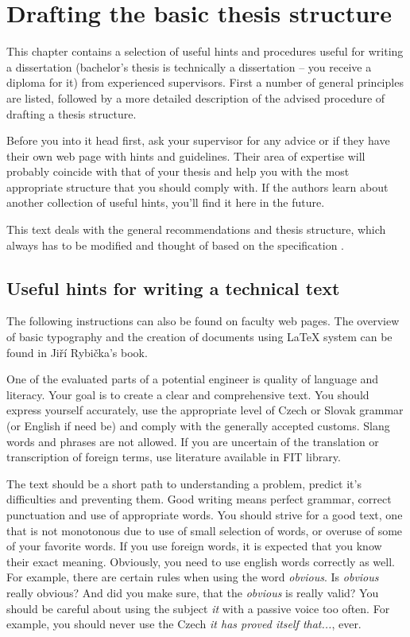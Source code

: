 \chapter{Drafting the basic thesis structure}
\label{struktura}

This chapter contains a selection of useful hints and procedures useful for writing a dissertation (bachelor's thesis is technically a dissertation -- you receive a diploma for it) from experienced supervisors. First a number of general principles are listed, followed by a more detailed description of the advised procedure of drafting a thesis structure.

Before you into it head first, ask your supervisor for any advice or if they have their own web page with hints and guidelines. Their area of expertise will probably coincide with that of your thesis and help you with the most appropriate structure that you should comply with. If the authors learn about another collection of useful hints, you'll find it here in the future.

This text deals with the general recommendations and thesis structure, which always has to be modified and thought of based on the specification \cite{Cernocky}.


\section{Useful hints for writing a technical text}

The following instructions can also be found on faculty web pages\cite{fitWeb}. The overview of basic typography and the creation of documents using \LaTeX{} system can be found in Jiří Rybička's book\cite{Rybicka}.

One of the evaluated parts of a potential engineer is quality of language and literacy. Your goal is to create a clear and comprehensive text. You should express yourself accurately, use the appropriate level of Czech or Slovak grammar (or English if need be) and comply with the generally accepted customs. Slang words and phrases are not allowed. If you are uncertain of the translation or transcription of foreign terms, use literature available in FIT library.

The text should be a short path to understanding a problem, predict it's difficulties and preventing them. Good writing means perfect grammar, correct punctuation and use of appropriate words. You should strive for a good text, one that is not monotonous due to use of small selection of words, or overuse of some of your favorite words. If you use foreign words, it is expected that you know their exact meaning. Obviously, you need to use english words correctly as well. For example, there are certain rules when using the word {\it obvious}. Is {\it obvious} really obvious? And did you make sure, that the {\it obvious} is really valid? You should be careful about using the subject {\it it} with a passive voice too often. For example, you should never use the Czech {\it it has proved itself that...}, ever.

